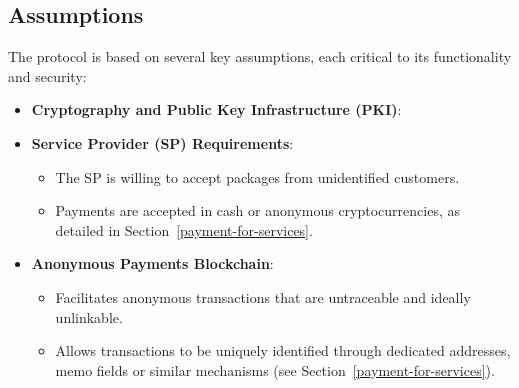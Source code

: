\documentclass[pdftex,twocolumn,epjc3]{svjour3}
\begin{document}
\subsection{Assumptions}
The protocol is based on several key assumptions, each critical to its functionality and security:

\begin{itemize}
  \item \textbf{Cryptography and Public Key Infrastructure (PKI)}:

\item \textbf{Service Provider (SP) Requirements}:
  \begin{itemize}
      \item The SP is willing to accept packages from unidentified customers.
      \item Payments are accepted in cash or anonymous cryptocurrencies, as detailed in Section~\ref{payment-for-services}.
   \end{itemize}

\item \textbf{Anonymous Payments Blockchain}:
  \begin{itemize}
      \item Facilitates anonymous transactions that are untraceable and ideally unlinkable.
      \item Allows transactions to be uniquely identified through dedicated addresses, memo fields or similar mechanisms (see Section~\ref{payment-for-services}).
  \end{itemize}


\end{itemize}
\end{document}
